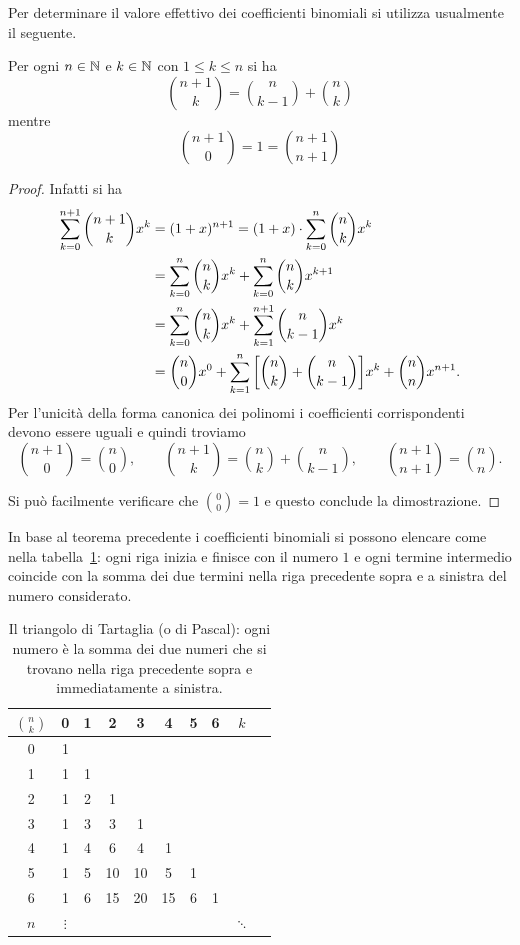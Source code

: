 Per determinare il valore effettivo dei coefficienti 
binomiali si utilizza usualmente il seguente.
  
\begin{theorem}
\mymark{*}%
\label{th:tartaglia}%
Per ogni $n\in {\mathbb N}$ e $k \in {\mathbb N}$ con $1 \le k \le n$ si ha
\[
  {n+1 \choose k} =
      {n \choose k-1} + {n \choose k}
\]
mentre
\[
  {n+1 \choose 0} = 1 = {n+1 \choose n+1}
\]
\end{theorem}
  \begin{proof}
  Infatti si ha 
  \begin{align*}
    \sum_{k=0}^{n+1} {n+1 \choose k} x^k
    &= (1+x)^{n+1} 
    = (1+x)\cdot \sum_{k=0}^n {n \choose k} x^k \\
    &= \sum_{k=0}^n {n\choose k} x^k 
    + \sum_{k=0}^n {n\choose k} x^{k+1}\\
    &= \sum_{k=0}^n {n\choose k} x^k 
    + \sum_{k=1}^{n+1} {n\choose k-1} x^{k}\\
    &= {n\choose 0} x^0 
      + \sum_{k=1}^n {\left[ {n\choose k} + {n\choose k-1} \right]} x^k
      + {n \choose n} x^{n+1}.
    \end{align*}
  Per l'unicità della forma canonica dei polinomi 
  i coefficienti corrispondenti devono essere uguali e quindi 
  troviamo
  \[
  {n+1 \choose 0} = {n \choose 0}, \qquad 
  {n+1 \choose k} = {n \choose k} + {n \choose k-1}, \qquad 
  {n+1 \choose n+1} = {n \choose n}.
  \]

  Si può facilmente verificare che  ${0 \choose 0} = 1$ 
  e questo conclude la dimostrazione.
  \end{proof}
  
  In base al teorema precedente i coefficienti binomiali si possono
  elencare come nella tabella~\ref{tab:binomiali}:
  ogni riga inizia e finisce con il numero $1$
  e ogni termine intermedio coincide con la somma dei
  due termini nella riga precedente sopra e
  a sinistra del numero considerato.
  
  \begin{table}
  \begin{tabular}{c|ccccccccc}
  $\displaystyle{n \choose k}$& 0 & 1 & 2 & 3 & 4 & 5 & 6 & $k$ &\\ \hline
    0 & 1 &   &   &   &   &   &   & &\\
    1 & 1 & 1 &   &   &   &   &   & &\\
    2 & 1 & 2 & 1 &   &   &   &   & &\\
    3 & 1 & 3 & 3 & 1 &   &   &   & &\\
    4 & 1 & 4 & 6 & 4 & 1 &   &   & &\\
    5 & 1 & 5 & 10& 10& 5 & 1 &   & &\\
    6 & 1 & 6 & 15& 20& 15& 6 & 1 & &\\
  $n$ &$\vdots$&&   &   &   &   &   & $\ddots$ &
  \end{tabular}
  \caption{Il triangolo di Tartaglia (o di Pascal):
  ogni numero è la somma dei due numeri che si trovano 
  nella riga precedente sopra e immediatamente a sinistra.}
  \label{tab:binomiali}
  \end{table}
  
